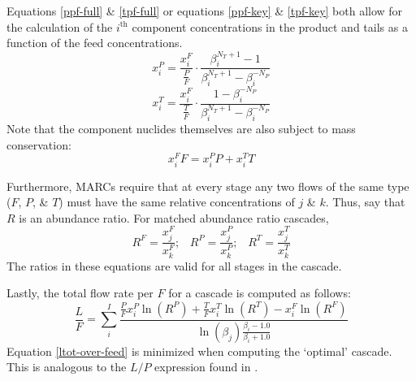 \documentclass{ansconf}
\newcommand{\ith}[0]{$i^{\mbox{th}}$ }
\begin{document}
Equations \ref{ppf-full} \& \ref{tpf-full} or equations \ref{ppf-key} \& 
\ref{tpf-key} both allow for the calculation of the \ith component concentrations in 
the product and tails as a function of the feed concentrations.
\begin{equation}
x_i^P = \frac{x_i^F}{\frac{P}{F}}\cdot\frac{\beta_i^{N_T+1} - 1}
                                           {\beta_i^{N_T+1} - \beta_i^{-N_P}}
\label{prod-concentration}
\end{equation}
\begin{equation}
x_i^T = \frac{x_i^F}{\frac{T}{F}}\cdot\frac{1 - \beta_i^{-N_P}}
                                           {\beta_i^{N_T+1} - \beta_i^{-N_P}}
\label{tail-concentration}
\end{equation}
Note that the component nuclides themselves are
also subject to mass conservation:
\begin{equation}
x_i^FF = x_i^PP + x_i^TT
\label{comp-flow-constraint}
\end{equation}

Furthermore, MARCs require that at every stage any two flows of 
the same type ($F$, $P$, \& $T$) must have the same relative concentrations of 
$j$ \& $k$.  Thus, say that $R$ is an abundance ratio.  For matched abundance 
ratio cascades, 
\begin{equation}
R^F = \frac{x_j^F}{x_k^F}; \;\;\; R^P = \frac{x_j^P}{x_k^P}; \;\;\; 
R^T = \frac{x_j^T}{x_k^T}
\label{abund_ratios}
\end{equation}
The ratios in these equations are valid for all stages in the cascade.

Lastly, the total flow rate per $F$ for a cascade is computed as follows:
\begin{equation}
\frac{L}{F} = \sum_i^I \frac{\frac{P}{F}x_i^P\ln(R^P) + \frac{T}{F}x_i^T\ln(R^T) 
                                                      - x_i^F\ln(R^F)}
                            {\ln(\beta_j)\frac{\beta_i - 1.0}{\beta_i + 1.0}}
\label{ltot-over-feed}
\end{equation}
Equation \ref{ltot-over-feed} is minimized when computing the `optimal' cascade.
This is analogous to the $L/P$ expression found in \cite{Wood1999}.
\end{document}

